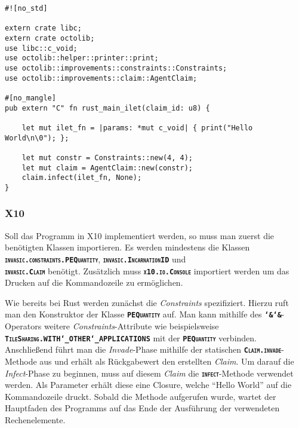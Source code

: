 \lstset{basicstyle=\tiny}
\begin{lstlisting}[float,caption={Minimales Invade, Infect, Retreat in Rust},label=code:rust_minimal_infect]
#![no_std]

extern crate libc;
extern crate octolib;
use libc::c_void;
use octolib::helper::printer::print;
use octolib::improvements::constraints::Constraints;
use octolib::improvements::claim::AgentClaim;

#[no_mangle]
pub extern "C" fn rust_main_ilet(claim_id: u8) {

    let mut ilet_fn = |params: *mut c_void| { print("Hello World\n\0"); };
    
    let mut constr = Constraints::new(4, 4);
    let mut claim = AgentClaim::new(constr);
    claim.infect(ilet_fn, None);
}
\end{lstlisting}
\lstset{basicstyle=\normalsize}

\subsubsection{X10}

Soll das Programm in X10 implementiert werden, so muss man zuerst die benötigten Klassen importieren. Es werden 
mindestens die Klassen \\
\texttt{\textsc{\textbf{invasic.constraints.PEQuantity}}},
\texttt{\textsc{\textbf{invasic.IncarnationID}}} und \\
\texttt{\textsc{\textbf{invasic.Claim}}}
benötigt. Zusätzlich muss \texttt{\textsc{\textbf{x10.io.Console}}} importiert werden
um das Drucken auf die Kommandozeile zu ermöglichen.

Wie bereits bei Rust werden zunächst die \textit{Constraints} spezifiziert. Hierzu
ruft man den Konstruktor der Klasse \texttt{\textsc{\textbf{PEQuantity}}} auf. Man kann mithilfe
des \texttt{\textsc{\textbf{\char`&\char`&}}}-Operators weitere \textit{Constraints}-Attribute wie beispielsweise \\
\texttt{\textsc{\textbf{TileSharing.WITH\char`_OTHER\char`_APPLICATIONS}}} mit der
\texttt{\textsc{\textbf{PEQuantity}}} verbinden.
Anschließend führt man die \textit{Invade}-Phase mithilfe der statischen
\texttt{\textsc{\textbf{Claim.invade}}}-Methode aus und erhält als Rückgabewert den erstellten \textit{Claim}.
Um darauf die \textit{Infect}-Phase zu beginnen, muss auf diesem \textit{Claim} die
\texttt{\textsc{\textbf{infect}}}-Methode verwendet werden.
Als Parameter erhält diese eine Closure, welche "`Hello World"' auf die Kommandozeile druckt.
Sobald die Methode aufgerufen wurde, wartet der Hauptfaden des Programms auf das Ende der Ausführung der
verwendeten Rechenelemente.

